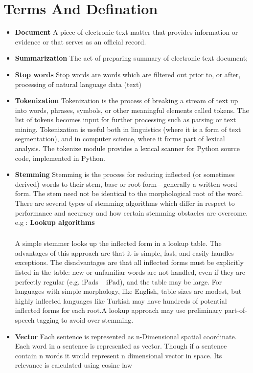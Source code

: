 \chapter{Terms And Defination}
\begin{itemize}
\item \textbf{Document} \newline A piece of electronic text matter that provides information or evidence or that serves as an official record.

\item \textbf{Summarization} \newline The act of preparing summary of electronic text document;

\item \textbf{Stop words} \newline Stop words are words which are filtered out prior to, or after, processing of natural language data (text)

\item \textbf{Tokenization} \newline Tokenization is the process of breaking a stream of text up into words, phrases, symbols, or other meaningful elements called tokens. The list of tokens becomes input for further processing such as parsing or text mining. Tokenization is useful both in linguistics (where it is a form of text segmentation), and in computer science, where it forms part of lexical analysis. The tokenize module provides a lexical scanner for Python source code, implemented in Python. 

\item \textbf{Stemming} \newline Stemming is the process for reducing inflected (or sometimes derived) words to their stem, base or root form—generally a written word form. The stem need not be identical to the morphological root of the word. There are several types of stemming algorithms which differ in respect to performance and accuracy and how certain stemming obstacles are overcome. e.g : \textbf{Lookup algorithms}
\paragraph{} A simple stemmer looks up the inflected form in a lookup table. The advantages of this approach are that it is simple, fast, and easily handles exceptions. The disadvantages are that all inflected forms must be explicitly listed in the table: new or unfamiliar words are not handled, even if they are perfectly regular (e.g. iPads ~ iPad), and the table may be large. For languages with simple morphology, like English, table sizes are modest, but highly inflected languages like Turkish may have hundreds of potential inflected forms for each root.A lookup approach may use preliminary part-of-speech tagging to avoid over stemming. 
\item \textbf{Vector} \newline
Each sentence is represented as n-Dimensional spatial coordinate. Each word in a sentence is represented as vector. Though if a sentence contain n words it would represent n dimensional vector in space. Its relevance is calculated using cosine law  


\end{itemize}
